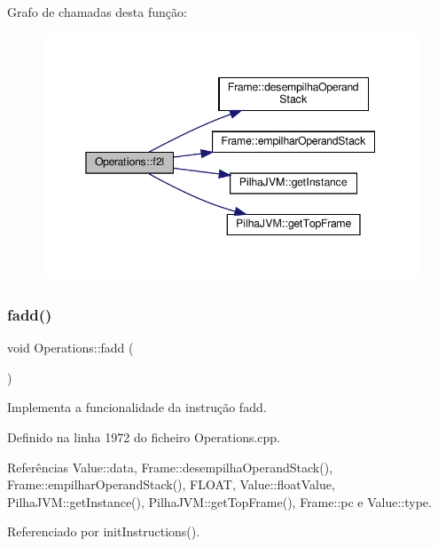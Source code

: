 Grafo de chamadas desta função\+:\nopagebreak
\begin{figure}[H]
\begin{center}
\leavevmode
\includegraphics[width=345pt]{classOperations_a175cdab8d092bdd6c27bace9efbcd27e_cgraph}
\end{center}
\end{figure}
\mbox{\label{classOperations_a01a07c700f0f1574552437b76f3fdcb4}} 
\subsubsection{\texorpdfstring{fadd()}{fadd()}}
{\footnotesize\ttfamily void Operations\+::fadd (\begin{DoxyParamCaption}{ }\end{DoxyParamCaption})\hspace{0.3cm}{\ttfamily [private]}}



Implementa a funcionalidade da instrução fadd. 



Definido na linha 1972 do ficheiro Operations.\+cpp.



Referências Value\+::data, Frame\+::desempilha\+Operand\+Stack(), Frame\+::empilhar\+Operand\+Stack(), F\+L\+O\+AT, Value\+::float\+Value, Pilha\+J\+V\+M\+::get\+Instance(), Pilha\+J\+V\+M\+::get\+Top\+Frame(), Frame\+::pc e Value\+::type.



Referenciado por init\+Instructions().

